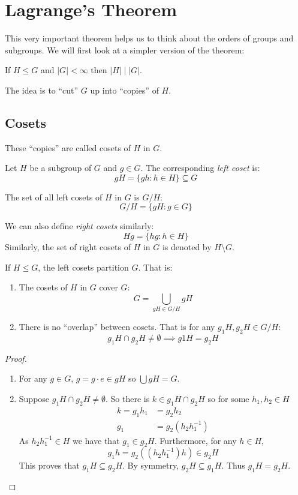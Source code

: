 \documentclass[../main.tex]{subfiles}
\begin{document}
\chapter{Lagrange's Theorem}
This very important theorem helps us to think about the orders of groups and subgroups.
We will first look at a simpler version of the theorem:
\begin{theorem}
  If $H \leq G$  and $|G| < \infty$ then $|H| \mid |G|$.
\end{theorem}
The idea is to ``cut'' $G$ up into ``copies'' of $H$.
\section{Cosets}
These ``copies'' are called cosets of $H$ in $G$.
\begin{definition}
  Let $H$ be a subgroup of $G$ and $g \in G$.
  The corresponding \textit{left coset} is:
  \[
    gH = \{gh : h \in H\} \subseteq G
  \]
\end{definition}
\begin{remark}[Notation]
  The set of all left cosets of $H$ in $G$ is $G / H$:
  \[
    G / H = \{gH : g \in G\}
  \]
\end{remark}
\begin{remark}
  We can also define \textit{right cosets} similarly:
  \[
    Hg = \{hg : h \in H\}
  \]
  Similarly, the set of right cosets of $H$ in $G$ is denoted by $H \setminus G$.
\end{remark}
\begin{lemma}
  If $H \leq G$, the left cosets partition $G$.
  That is:
  \begin{enumerate}
    \item The cosets of $H$ in $G$ cover $G$:
      \[
        G = \bigcup_{gH \in G / H} gH
      \]
    \item There is no ``overlap'' between cosets.
      That is for any $g_1H, g_2H \in G / H$:
      \[
        g_1H \cap g_2H \neq \emptyset \implies g1H = g_2H
      \]
  \end{enumerate}
\end{lemma}
\begin{proof}
  \begin{enumerate}
    \item For any $g \in G$, $g = g \cdot e \in gH$ so $\bigcup gH = G$.
    \item Suppose $g_1H \cap g_2H \neq \emptyset$.
      So there is $k \in g_1H \cap g_2H$ so for some $h_1, h_2 \in H$
      \begin{align*}
        k = g_1 h_1 &= g_2 h_2 \\
        g_1 &= g_2 (h_2 h^{-1}_{1})
      \end{align*}
      As $h_2 h^{-1}_{1} \in H$ we have that $g_1 \in g_2 H$.
      Furthermore, for any $h \in H$,
      \[
        g_1 h = g_2 ((h_2 h^{-1}_{1}) h) \in g_2 H
      \]
      This proves that $g_1H \subseteq g_2H$.
      By symmetry, $g_2 H \subseteq g_1 H$.
      Thus $g_1H = g_2H$.
  \end{enumerate}
\end{proof}
\end{document}
